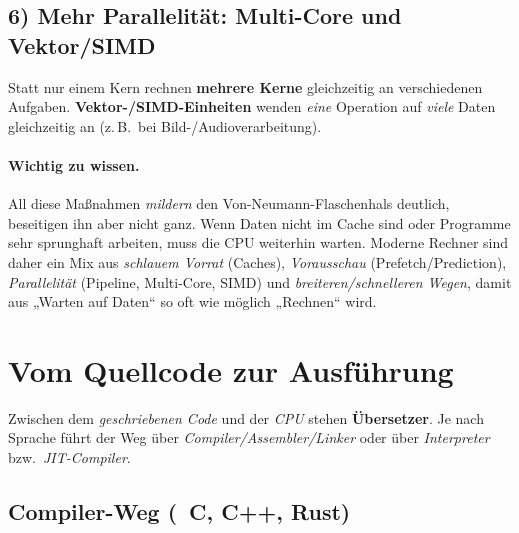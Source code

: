 \documentclass[../skript/main.tex]{subfiles}
\begin{document}
\subsection*{6) Mehr Parallelität: Multi-Core und Vektor/SIMD}
Statt nur einem Kern rechnen \textbf{mehrere Kerne} gleichzeitig an verschiedenen Aufgaben.
\textbf{Vektor-/SIMD-Einheiten} wenden \emph{eine} Operation auf \emph{viele} Daten gleichzeitig an
(z.\,B.\ bei Bild-/Audioverarbeitung).

\paragraph{Wichtig zu wissen.}
All diese Maßnahmen \emph{mildern} den Von-Neumann-Flaschenhals deutlich, beseitigen ihn aber nicht ganz.
Wenn Daten nicht im Cache sind oder Programme sehr sprunghaft arbeiten, muss die CPU weiterhin warten.
Moderne Rechner sind daher ein Mix aus \emph{schlauem Vorrat} (Caches), \emph{Vorausschau}
(Prefetch/Prediction), \emph{Parallelität} (Pipeline, Multi-Core, SIMD) und \emph{breiteren/schnelleren Wegen},
damit aus „Warten auf Daten“ so oft wie möglich „Rechnen“ wird.

\section{Vom Quellcode zur Ausführung}\label{sec:toolchain}

Zwischen dem \emph{geschriebenen Code} und der \emph{CPU} stehen \textbf{Übersetzer}.
Je nach Sprache führt der Weg über \emph{Compiler/Assembler/Linker} oder über
\emph{Interpreter} bzw.\ \emph{JIT-Compiler}.

\subsection{Compiler-Weg (\ZB\ C, C++, Rust)}%
\end{document}
